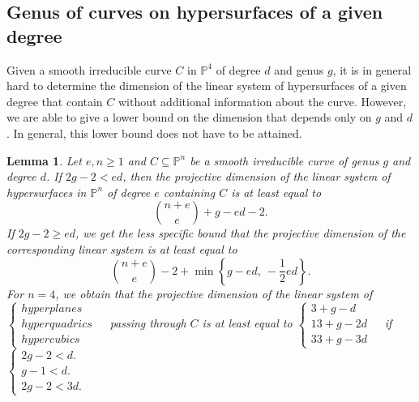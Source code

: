\documentclass[english,11pt,reqno]{amsart}
\newcommand{\sub}{\subseteq}
\newcommand{\Pfour}{\mathbb{P}^4}
\newcommand{\Pn}{\mathbb{P}^n}
\newtheorem{lem}[thm]{Lemma}
\begin{document}
\subsection{Genus of curves on hypersurfaces of a given degree} \label{subsection:genus_curves_hypersurfaces}
%
%
Given a smooth irreducible curve $C$ in $\Pfour$ of degree $d$ and genus $g$, it is in general hard to determine the dimension of the linear system of hypersurfaces of a given degree that contain $C$ without additional information about the curve. However, we are able to give a lower bound on the dimension that depends only on $g$ and $d$. In general, this lower bound does not have to be attained.
%
%
\begin{lem} \label{lem:dimension_linear_system_hypersurfaces}
	Let $e,n\geq 1$ and $C \sub \Pn$ be a smooth irreducible curve of genus $g$ and degree $d$. If $2g - 2 < e d$, then the projective dimension of the linear system of hypersurfaces in $\Pn$ of degree $e$ containing $C$ is at least equal to
	$$\binom{n + e}{e} + g - ed -2 .$$
	If  $2g - 2\geq e d$, we get the less specific bound that the projective dimension of the corresponding linear system is at least equal to
	$$\binom{n + e}{e}-2+\min\left\{g - ed,\: -\frac{1}{2} ed\right\}.$$
	For $n=4$, we obtain that the projective dimension of the linear system of\\
	$\begin{cases}
		hyperplanes & \\
		hyperquadrics & \\
		hypercubics
	\end{cases}$
	passing through $C$ is at least equal to
	$\begin{cases}
		3+g-d& \\
		13+g-2d& \\
		33+g-3d
	\end{cases}$ if 
	$\begin{cases}
		2g-2<d.& \\
		g-1<d. & \\
		2g-2<3d.
	\end{cases}$
\end{lem}
%
%
\end{document}
